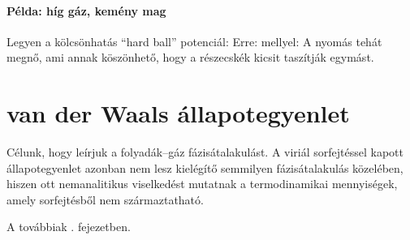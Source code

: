    \paragraph{Példa: híg gáz, kemény mag}
    
    Legyen a kölcsönhatás ``hard ball'' potenciál:
    Erre:
    mellyel:
    A nyomás tehát megnő, ami annak köszönhető, hogy a részecskék kicsit taszítják egymást. 
    
 \section{van der Waals állapotegyenlet}
  
  Célunk, hogy leírjuk a folyadák--gáz fázisátalakulást.
   A viriál sorfejtéssel kapott állapotegyenlet azonban nem lesz kielégítő semmilyen fázisátalakulás közelében, hiszen ott nemanalitikus viselkedést mutatnak a termodinamikai mennyiségek, amely sorfejtésből nem származtatható.
  
  A továbbiak . fejezetben.
